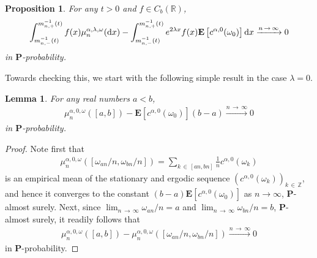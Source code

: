 \documentclass[10pt]{amsart}
\newtheorem{lemm}[theo]{Lemma}\newtheorem{prop}[theo]{Proposition}\newtheorem{coro}[theo]{Corollary}\newtheorem{conj}[theo]{Conjecture}
\theoremstyle{definition}\newtheorem{defi}[theo]{Definition}\newtheorem{rema}[theo]{Remark}\newtheorem{exam}[theo]{Example}\newtheorem{exem}[theo]{Example}\newtheorem{nota}[theo]{Notation}
\newcommand{\Z}{\mathbb Z}
\newcommand{\R}{\mathbb R}
\newcommand{\bfP}{\mathbf{P}}
\newcommand{\bfE}{\mathbf{E}}
\newcommand{\dd}{\text{\upshape{d}}}
\begin{document}
\begin{prop}\label{prop:inv_meas}
For any $t>0$ and $f\in C_b(\R)$,
\begin{equation*}
\int_{m_{n,-}^{-1}(t)}^{m_{n,+}^{-1}(t)}f(x)\mu_n^{\alpha,\lambda,\omega}(\dd x)-
\int_{m_{n,-}^{-1}(t)}^{m_{n,+}^{-1}(t)}e^{2\lambda x}f(x)\bfE\left[c^{\alpha,0}(\omega_0)\right]\dd x\xrightarrow{n\,\to\,\infty} 0
\end{equation*}
in $\bfP$-probability.
\end{prop}

Towards checking this, we start with the following simple result in the case $\lambda=0$.

\begin{lemm}\label{lem:quantitativeLLN}
For any real numbers $a<b$,
\begin{align*}
\mu^{\alpha,0,\omega}_n([a,b])-\bfE\left[c^{\alpha,0}(\omega_0)\right](b-a)\xrightarrow{n\,\to\,\infty} 0
\end{align*}
in $\bfP$-probability.
\end{lemm}

\begin{proof}
Note first that
\begin{align*}
\mu^{\alpha,0,\omega}_n\left(\left[\omega_{an}/n,\omega_{bn}/n\right]\right)=\sum_{k\,\in\,[an,bn]}\frac{1}{n}c^{\alpha,0}(\omega_k)
\end{align*}
is an empirical mean of the stationary and ergodic sequence $(c^{\alpha,0}(\omega_k))_{k\,\in\,\Z}$, and hence it converges to the constant $(b-a)\bfE[c^{\alpha,0}(\omega_0)]$ as $n\to\infty$, $\bfP$-almost surely. Next, since $\lim_{n\,\to\,\infty}\omega_{an}/n= a$ and $\lim_{n\,\to\,\infty}\omega_{bn}/n=b$, $\bfP$-almost surely, it readily follows that
\begin{align*}
\mu^{\alpha,0,\omega}_n([a,b])-\mu^{\alpha,0,\omega}_n([\omega_{an}/n,\omega_{bn}/n])\xrightarrow{n\,\to\,\infty} 0
\end{align*}
in $\bfP$-probability.
\end{proof}
\end{document}
